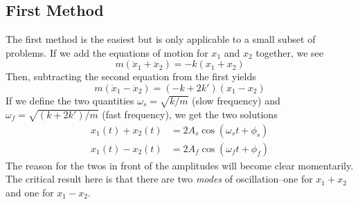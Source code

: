 \subsection*{First Method}
The first method is the easiest but is only applicable to a small subset of problems. If we add the equations of motion for $x_1$ and $x_2$ together, we see
\[ m(\ddot x_1 + \ddot x_2) = -k(x_1+x_2)\]
Then, subtracting the second equation from the first yields
\[ m(\ddot x_1 - \ddot x_2) = (-k+2k')(x_1-x_2)\]
If we define the two quantities $\omega_s = \sqrt{k/m}$ (slow frequency) and $\omega_f = \sqrt{(k+2k')/m}$ (fast frequency), we get the two solutions
\begin{align*}
    x_1(t) + x_2(t) &= 2A_s\cos(\omega_s t + \phi_s) \\
    x_1(t) - x_2(t) &= 2A_f\cos(\omega_f t+\phi_f)
\end{align*}
The reason for the twos in front of the amplitudes will become clear momentarily. The critical result here is that there are two \textit{modes} of oscillation--one for $x_1+x_2$ and one for $x_1-x_2$. 

